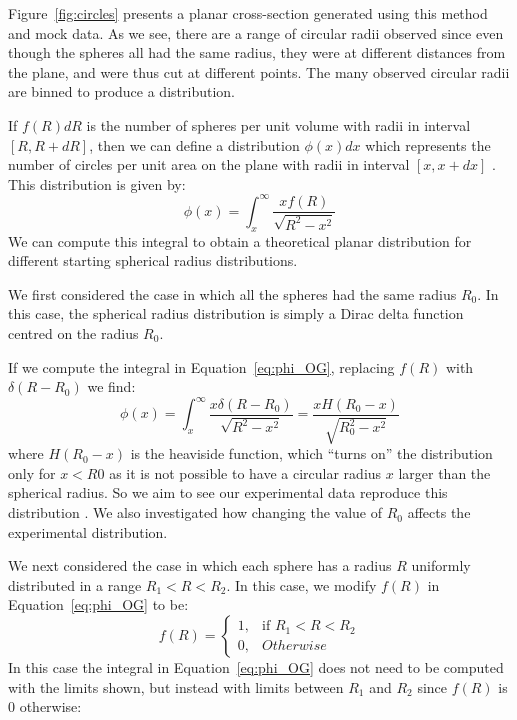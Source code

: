 \documentclass[journal]{IEEEtran}
\begin{document}
Figure~\ref{fig:circles} presents a planar cross-section generated using this
method and mock data. As we see, there are a range of circular radii observed
since even though the spheres all had the same radius, they were at different
distances from the plane, and were thus cut at different points. The many
observed circular radii are binned to produce a distribution.

If $f(R)dR$ is the number of spheres per unit volume with radii in interval $[R,
R + dR]$, then we can define a distribution $\phi(x)dx$ which represents the
number of circles per unit area on the plane with radii in interval $[x,
x+dx]$ \cite{Kiderlen2011}. This distribution is given by:
\begin{equation}
\phi(x) = \int_{x}^{\infty}\frac{xf(R)}{\sqrt{R^2 - x^2}}
\label{eq:phi_OG}
\end{equation}
We can compute this integral to obtain a theoretical planar distribution for
different starting spherical radius distributions.

We first considered the case in which all the spheres had the same radius
$R_0$. In this case, the spherical radius distribution is simply a Dirac delta
function centred on the radius $R_0$.

If we compute the integral in Equation~\ref{eq:phi_OG}, replacing $f(R)$ with
$\delta(R-R_0)$ we find:
\begin{equation}
\phi(x) = \int_{x}^{\infty}\frac{x\delta(R-R_0)}{\sqrt{R^2 - x^2}} =
\frac{xH(R_0-x)}{\sqrt{R_0^2-x^2}}
\label{eq:phi_constant}
\end{equation}
where $H(R_0 - x)$ is the heaviside function, which ``turns on'' the
distribution only for $x < R0$ as it is not possible to have a circular radius
$x$ larger than the spherical radius. So we aim to see our experimental data
reproduce this distribution \cite{Kong2005}. We also investigated how changing the
value of $R_0$ affects the experimental distribution.

We next considered the case in which each sphere has a radius $R$ uniformly
distributed in a range $R_1 < R < R_2$. In this case, we modify $f(R)$ in
Equation~\ref{eq:phi_OG} to be:
\begin{equation*}
  f(R) =
  \begin{cases}
    1,& \text{if } R_1 < R < R_2\\
    0,& \text{} Otherwise
  \end{cases}
\end{equation*}
In this case the integral in Equation~\ref{eq:phi_OG} does not need to be
computed with the limits shown, but instead with limits between $R_1$ and $R_2$
since $f(R)$ is 0 otherwise:
\end{document}
